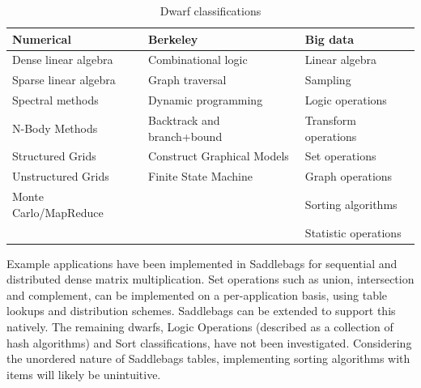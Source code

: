 \documentclass{uit-report}
\begin{document}
\vskip 0.9cm
\begin{table}[h]
	\begin{center}
		
		\setlength\arrayrulewidth{1pt}
		\renewcommand{\arraystretch}{2}
		\begin{tabular}{ | p{4cm} | p{4cm} | p{4cm} |}
			\hline
			\textbf{Numerical} & \textbf{Berkeley} & \textbf{Big data}\\ \hline
			Dense linear algebra & Combinational logic & Linear algebra \\ \hline
			Sparse linear algebra & Graph traversal &  Sampling \\ \hline
			Spectral methods & Dynamic programming &  Logic operations \\ \hline
			N-Body Methods & Backtrack and branch+bound &  Transform operations \\ \hline
			Structured Grids & Construct Graphical Models &  Set operations \\ \hline
			Unstructured Grids & Finite State Machine &  Graph operations \\ \hline
			Monte Carlo/MapReduce &  &  Sorting algorithms\\ \hline
			 &  &  Statistic operations\\ \hline
		\end{tabular}
		\caption{Dwarf classifications}
		\label{table:dwarfs}
		
	\end{center}
\end{table}






\newpage
Example applications have been implemented in Saddlebags for sequential and distributed dense matrix multiplication. Set operations such as union, intersection and complement, can be implemented on a per-application basis, using table lookups and distribution schemes. Saddlebags can be extended to support this natively. The remaining dwarfs, Logic Operations (described as a collection of hash algorithms) and Sort classifications, have not been investigated. Considering the unordered nature of Saddlebags tables, implementing sorting algorithms with items will likely be unintuitive.
\end{document}
